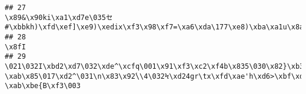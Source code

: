 \documentclass[
]{article}
\begin{document}
\begin{verbatim}
## 27                                                                                                                                                                                                                                                                                                                                                                                                                                                                                                                                                                                                                                                                                                                                                                                                         \x89&\x90ki\xa1\xd7e\035セ#\xbbkh)\xfd\xef]\xe9)\xedix\xf3\x98\xf7=\xa6\xda\177\xe8)\xba\xa1u\x8aL
## 28                                                                                                                                                                                                                                                                                                                                                                                                                                                                                                                                                                                                                                                                                                                                                                                                                                                                                                      \x8fI
## 29                                                                                                                                                                                                                                                                                                                                                                                                                            \021\032I\xbd2\xd7\032\xde^\xcfq\001\x91\xf3\xc2\xf4b\x835\030\x82}\xb3y\xa8z\xb7\xeb\x85\027ΓŋG\035\x85\x85\n\xf3\xd2\xd5\xf0u\xe2\xed\xb1\xcc\xf2,.\x8b\xae\x8c\xb7\x9cwqqjy\xfc\xbc\xcd\xcf9o\xdbÑ\xb7\xdf\020\005\xb4\t1\xae\x86\xd1\xfbyǘ\x93#j\xe1\022\x9a\xd1\004s \xab\x85\017\xd2^\031\n\x83\x92ؑ\\4\032Ϟ\xd24gr\tx\xfd\xae'h\xd6>\xbf\xd7/8\xb8{\xb9V[\xac\xfaG\xd1JZr4\xf8D\x92fn\024\026gR!\xfc\x961I\xc6\a\x8e\xff\x9c\x91\xad5\034\xb0\xa6b\177 \xab\xbe{B\xf3\003

\end{verbatim}
\end{document}
